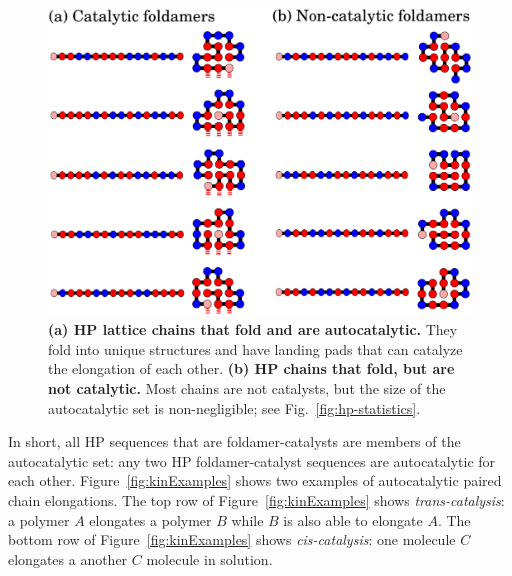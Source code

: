 \documentclass[5p,times]{elsarticle}
\begin{document}
\begin{figure}[htb!]
  \centering
  \includegraphics[width=\columnwidth]{pictures/fold-cat.pdf} 
  \caption{\footnotesize{\textbf{(a) HP lattice chains that fold and are autocatalytic.}  They fold 
into unique structures and have landing pads that can catalyze the elongation of each other.  
\textbf{(b) HP chains that fold, but are not catalytic.}  Most chains are not catalysts, but the 
size of the autocatalytic set is non-negligible; see Fig.~\ref{fig:hp-statistics}.}}
  \label{fig:fold-cat}
\end{figure}

 In short, all HP sequences that are foldamer-catalysts are members of the autocatalytic set: any 
two HP foldamer-catalyst sequences are autocatalytic for each other.  Figure~\ref{fig:kinExamples} 
shows two examples of autocatalytic paired chain elongations.  The top row of 
Figure~\ref{fig:kinExamples} shows \emph{trans-catalysis}: a polymer $A$ elongates a polymer $B$ 
while $B$ is also able to elongate $A$.  The bottom row of Figure~\ref{fig:kinExamples} shows 
\emph{cis-catalysis}: one molecule $C$ elongates a another $C$ molecule in solution.
\end{document}
